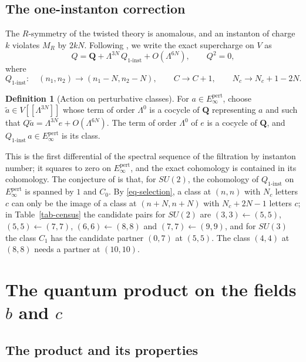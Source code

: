 \documentclass[11pt]{article}
\numberwithin{equation}{section}
\numberwithin{figure}{section}
\numberwithin{table}{section}
\theoremstyle{definition}
\newtheorem{definition}[theorem]{Definition}
\newcommand{\Qp}{\mathbf Q}
\newcommand{\Qi}{Q_{1\text{-}\mathrm{inst}}}
\newcommand{\Ep}{E_\infty^{\mathrm{pert}}}
\begin{document}
\subsection{The one-instanton correction}\label{sec-inst-rule}

The $R$-symmetry of the twisted theory is anomalous, and an instanton of charge $k$ violates $M_R$ by $2kN$. Following \cite[Equation~(8.6)]{semichiral}, we write the exact supercharge on $V$ as
\begin{equation}\label{eq-Qexact}
Q=\Qp+\Lambda^{3N}\,\Qi+O(\Lambda^{6N}),\qquad Q^2=0,
\end{equation}
where
\begin{equation}\label{eq-selection}
\Qi:\quad (n_1,n_2)\to(n_1-N,n_2-N),\qquad C\to C+1,\qquad N_c\to N_c+1-2N .
\end{equation}

\begin{definition}[Action on perturbative classes]\label{def-Qi}
For $a\in\Ep$, choose $\tilde a\in V[[\Lambda^{3N}]]$ whose term of order $\Lambda^0$ is a cocycle of $\Qp$ representing $a$ and such that $Q\tilde a=\Lambda^{3N}e+O(\Lambda^{6N})$. The term of order $\Lambda^0$ of $e$ is a cocycle of $\Qp$, and $\Qi\,a\in\Ep$ is its class.
\end{definition}

This is the first differential of the spectral sequence of the filtration by instanton number; it squares to zero on $\Ep$, and the exact cohomology is contained in its cohomology. The conjecture of \cite[Section~8]{semichiral} is that, for $SU(2)$, the cohomology of $\Qi$ on $\Ep$ is spanned by $1$ and $C_0$. By \eqref{eq-selection}, a class at $(n,n)$ with $N_c$ letters $c$ can only be the image of a class at $(n+N,n+N)$ with $N_c+2N-1$ letters $c$; in Table~\ref{tab-census} the candidate pairs for $SU(2)$ are $(3,3)\leftarrow(5,5)$, $(5,5)\leftarrow(7,7)$, $(6,6)\leftarrow(8,8)$ and $(7,7)\leftarrow(9,9)$, and for $SU(3)$ the class $C_1$ has the candidate partner $(0,7)$ at $(5,5)$. The class $(4,4)$ at $(8,8)$ needs a partner at $(10,10)$.

\section{The quantum product on the fields $b$ and $c$}\label{sec-product}

\subsection{The product and its properties}\label{sec-product-properties}
\end{document}

